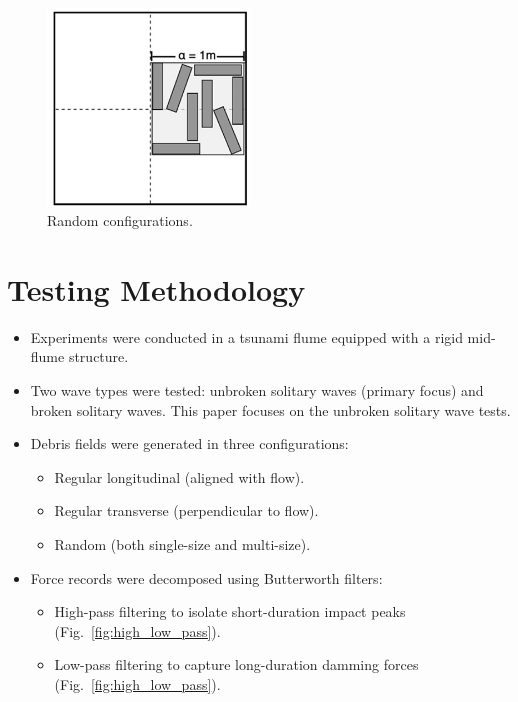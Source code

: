 \documentclass{article}
\begin{document}
\begin{figure}[htbp]
    \centering
    \includegraphics[width=0.48\textwidth]{configurations_rand.jpg}
    \caption{Random configurations.}
    \label{fig:configurations_random}
\end{figure}

\section{Testing Methodology}
\begin{itemize}
    \item Experiments were conducted in a tsunami flume equipped with a rigid mid-flume structure.
    \item Two wave types were tested: unbroken solitary waves (primary focus) and broken solitary waves. This paper focuses on the unbroken solitary wave tests. 
    \item Debris fields were generated in three configurations:
    \begin{itemize}
        \item Regular longitudinal (aligned with flow).
        \item Regular transverse (perpendicular to flow).
        \item Random (both single-size and multi-size).
    \end{itemize}
    \item Force records were decomposed using Butterworth filters:
    \begin{itemize}
        \item High-pass filtering to isolate short-duration impact peaks (Fig.~\ref{fig:high_low_pass}).
        \item Low-pass filtering to capture long-duration damming forces (Fig.~\ref{fig:high_low_pass}).
    \end{itemize}
\end{itemize}
\end{document}
